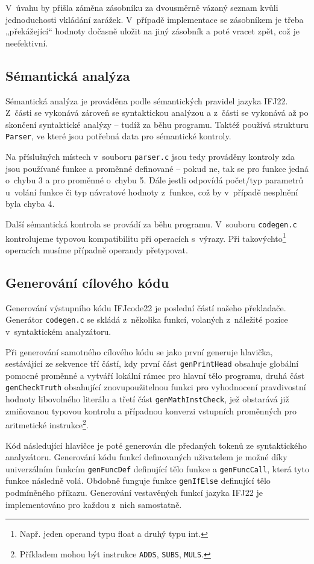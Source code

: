 \documentclass[a4paper,12pt]{article}
\begin{document}
V~úvahu by přišla záměna zásobníku za dvousměrně vázaný seznam kvůli jednoduchosti vkládání zarážek. V~případě implementace se zásobníkem je třeba „překážející“ hodnoty dočasně uložit na jiný zásobník a poté vracet zpět, což je neefektivní.

\subsection{Sémantická analýza}
Sémantická analýza je prováděna podle sémantických pravidel jazyka IFJ22. Z~části se vykonává zároveň se syntaktickou analýzou  a z~části se vykonává až po skončení syntaktické analýzy -- tudíž za běhu programu. Taktéž používá strukturu \verb|Parser|, ve které jsou potřebná data pro sémantické kontroly. 

Na příslušných místech v~souboru \verb|parser.c| jsou tedy prováděny kontroly zda jsou používané funkce a proměnné definované -- pokud ne, tak se pro funkce jedná o~chybu 3 a pro proměnné o~chybu 5. Dále jestli odpovídá počet/typ parametrů u~volání funkce či typ návratové hodnoty z~funkce, což by v~případě nesplnění byla chyba 4.

Další sémantická kontrola se provádí za běhu programu. V~souboru \verb|codegen.c| kontrolujeme typovou kompatibilitu při operacích s~výrazy. Při takovýchto\footnote{Např. jeden operand typu float a druhý typu int.} operacích musíme případně operandy přetypovat.

\subsection{Generování cílového kódu}
Generování výstupního kódu IFJcode22 je poslední částí našeho překladače. Generátor \verb|codegen.c| se skládá z~několika funkcí, volaných z~náležité pozice v~syntaktickém analyzátoru. 

Při generování samotného cílového kódu se jako první generuje hlavička, sestávájící ze sekvence tří částí, kdy první část \verb|genPrintHead| obsahuje globální pomocné proměnné a vytváří lokální rámec pro hlavní tělo programu, druhá část \verb|genCheckTruth| obsahující znovupoužitelnou funkci pro vyhodnocení pravdivostní hodnoty libovolného literálu a třetí část \verb|genMathInstCheck|, jež obstarává již zmiňovanou typovou kontrolu a případnou konverzi vstupních proměnných pro aritmetické instrukce\footnote{Příkladem mohou být instrukce \verb|ADDS|, \verb|SUBS|, \verb|MULS|.}.

Kód následující hlavičce je poté generován dle předaných tokenů ze syntaktického analyzátoru. Generování kódu funkcí definovaných uživatelem je možné díky univerzálním funkcím \verb|genFuncDef| definující tělo funkce a \verb|genFuncCall|, která tyto funkce následně volá. Obdobně funguje funkce \verb|genIfElse| definující tělo podmíněného příkazu. Generování vestavěných funkcí jazyka IFJ22 je implementováno pro každou z~nich samostatně.
\end{document}
